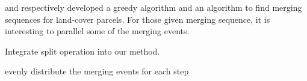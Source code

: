 \documentclass[ijgi,article,submit,moreauthors,pdftex]{Definitions/mdpi}
\begin{document}
\citet{vanOosterom2005} and \citet[]{Peng2019Thesis}
respectively developed a greedy algorithm and an \Astar algorithm to find
merging sequences for land-cover parcels.
For those given merging sequence,
it is interesting to parallel some of the merging events.

Integrate split operation into our method.

evenly distribute the merging events for each step

%
%
%
%
%
\end{document}

